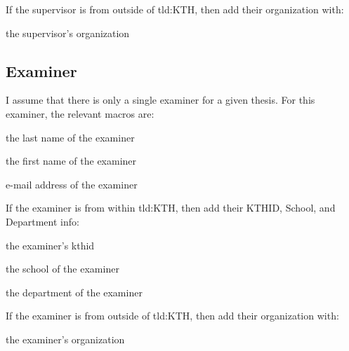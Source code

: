 If the supervisor is from outside of \gls{tld:KTH}, then add their organization with:
\begin{description}[leftmargin=!, labelwidth =\widthof{\texttt{\textbackslash secondAuthorsFirstname\{\}}}]
\item [\texttt{\textbackslash supervisorXsOrganization\{\}}] the supervisor's organization
\end{description}

\subsection{Examiner}
\label{sec:examinerMacros}
I assume that there is only a single examiner for a given thesis. For this examiner, the relevant macros are:
\begin{description}[leftmargin=!, labelwidth =\widthof{\texttt{\textbackslash secondAuthorsFirstname\{\}}}]
\item [\texttt{\textbackslash examinersLastname\{\}}] the last name of the examiner
\item [\texttt{\textbackslash examinersFirstname\{\}}] the first name of the examiner
\item [\texttt{\textbackslash examinersEmail\{\}}] e-mail address of the examiner
\end{description}

If the examiner is from within \gls{tld:KTH}, then add their KTHID, School, and Department info:
\begin{description}[leftmargin=!, labelwidth =\widthof{\texttt{\textbackslash secondAuthorsFirstname\{\}}}]
\item [\texttt{\textbackslash examinersKTHID\{\}}] the examiner's kthid 
\item [\texttt{\textbackslash examinersSchool\{\}}] the school of the examiner
\item [\texttt{\textbackslash examinersDepartment\{\}}] the department of the examiner
\end{description}

If the examiner is from outside of \gls{tld:KTH}, then add their organization with:
\begin{description}[leftmargin=!, labelwidth =\widthof{\texttt{\textbackslash secondAuthorsFirstname\{\}}}]
\item [\texttt{\textbackslash examinersOrganization\{\}}] the examiner's organization
\end{description}


